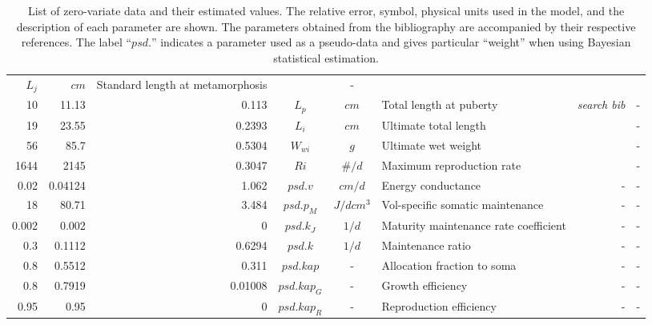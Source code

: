 \begin{table}[H]
\begin{adjustbox}{width=1.0\textwidth}
\begin{NiceTabular}{r|r|r|c|c|l|r|r}
$L_{j}$								& 
$cm$								& 
Standard length at metamorphosis	&
\cite{MoreClar2011}					&
-									\\
10							&
11.13						& 
0.113						& 
$L_{p}$						& 
$cm$						&
Total length at puberty		&
\textit{search bib}			&
-							\\
19                    &
23.55                 & 
0.2393                & 
$L_{i}$               & 
$cm$                  &
Ultimate total length &
\cite{MarzShin2009}   &
-					   \\
56                  &
85.7                &
0.5304              &
$W_{wi}$            & 
$g$                 & 
Ultimate wet weight &
\cite{PaloMuck1987} &
-					 \\
1644						& 
2145						& 
0.3047						& 
$Ri$						& 
$\#/d$						& 
Maximum reproduction rate	&
\cite{PereBuit2000}			&
-							\\
0.02					& 
0.04124					& 
1.062					& 
$psd.v$					& 
$cm/d$					& 
Energy conductance		&
-						&
-						\\
18                           		& 
80.71                        		& 
3.484                        		& 
$psd.p_{M}$                  		& 
$J/dcm^3$ 					  		& 
Vol-specific somatic maintenance	&
-							  		&
-							  		\\
0.002                           		&
0.002                           		&
0                               		&
$psd.k_{J}$                        		&
$1/d$                      		 		&
Maturity maintenance rate coefficient  &
-										&
-										\\
0.3					&
0.1112				&
0.6294				&
$psd.k$				&
$1/d$				&
Maintenance ratio	&
-					&
-					\\
0.8								& 
0.5512							& 
0.311							& 
$psd.kap$						&
-								& 
Allocation fraction to soma		&
-								&
-								\\
0.8					& 
0.7919				& 
0.01008				& 
$psd.kap_{G}$		& 
-					& 
Growth efficiency	&
-					&
-					\\
0.95                   		&
0.95                   		&
0                      		&
$psd.kap_{R}$          		& 
-                      		&
Reproduction efficiency		&
-							&
-							\\
\hline
\end{NiceTabular}
\end{adjustbox}
\caption{List of zero-variate data and their estimated values. The relative error, symbol, physical units used in the model, and the description of each parameter are shown. The parameters obtained from the bibliography are accompanied by their respective references. The label ``$psd.$'' indicates a parameter used as a pseudo-data and gives particular ``weight'' when using Bayesian statistical estimation.} 
\label{zero-variate}
\end{table}

